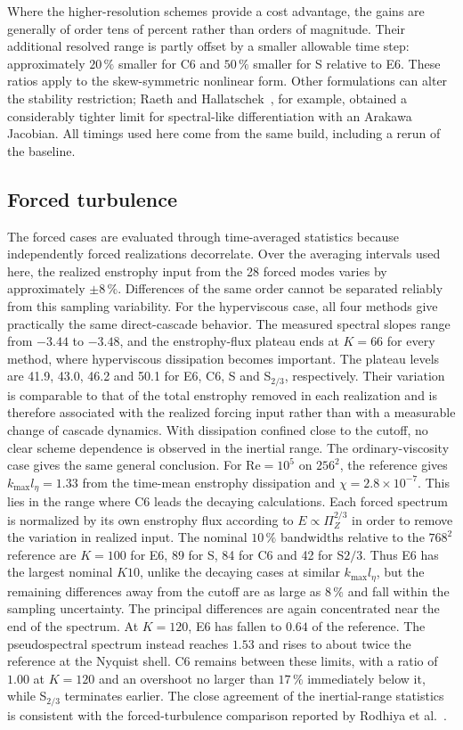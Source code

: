 \documentclass[11pt,a4paper]{article}
\newcommand{\Rey}{\mathrm{Re}}
\begin{document}
Where the higher-resolution schemes provide a cost advantage, the gains are generally of order tens of percent rather than orders of magnitude. Their additional resolved range is partly offset by a smaller allowable time step: approximately $20\,\%$ smaller for C6 and $50\,\%$ smaller for S relative to E6. These ratios apply to the skew-symmetric nonlinear form. Other formulations can alter the stability restriction; Raeth and Hallatschek~\cite{raeth2024}, for example, obtained a considerably tighter limit for spectral-like differentiation with an Arakawa Jacobian. All timings used here come from the same build, including a rerun of the baseline.
\subsection{Forced turbulence}
\label{sec:forced}
The forced cases are evaluated through time-averaged statistics because independently forced realizations decorrelate. Over the averaging intervals used here, the realized enstrophy input from the 28 forced modes varies by approximately $\pm8\,\%$. Differences of the same order cannot be separated reliably from this sampling variability.
For the hyperviscous case, all four methods give practically the same direct-cascade behavior. The measured spectral slopes range from $-3.44$ to $-3.48$, and the enstrophy-flux plateau ends at $K=66$ for every method, where hyperviscous dissipation becomes important. The plateau levels are 41.9, 43.0, 46.2 and 50.1 for E6, C6, S and S$_{2/3}$, respectively. Their variation is comparable to that of the total enstrophy removed in each realization and is therefore associated with the realized forcing input rather than with a measurable change of cascade dynamics. With dissipation confined close to the cutoff, no clear scheme dependence is observed in the inertial range.
The ordinary-viscosity case gives the same general conclusion. For $\Rey=10^5$ on $256^2$, the reference gives $k_{\max}l_\eta=1.33$ from the time-mean enstrophy dissipation and $\chi=2.8\times10^{-7}$. This lies in the range where C6 leads the decaying calculations. Each forced spectrum is normalized by its own enstrophy flux according to $E\propto\Pi_Z^{2/3}$ in order to remove the variation in realized input. The nominal $10\,\%$ bandwidths relative to the $768^2$ reference are $K=100$ for E6, 89 for S, 84 for C6 and 42 for S${2/3}$. Thus E6 has the largest nominal $K{10}$, unlike the decaying cases at similar $k_{\max}l_\eta$, but the remaining differences away from the cutoff are as large as $8\,\%$ and fall within the sampling uncertainty.
The principal differences are again concentrated near the end of the spectrum. At $K=120$, E6 has fallen to $0.64$ of the reference. The pseudospectral spectrum instead reaches $1.53$ and rises to about twice the reference at the Nyquist shell. C6 remains between these limits, with a ratio of $1.00$ at $K=120$ and an overshoot no larger than $17\,\%$ immediately below it, while S$_{2/3}$ terminates earlier. The close agreement of the inertial-range statistics is consistent with the forced-turbulence comparison reported by Rodhiya et al.~\cite{rodhiya2026}.
\end{document}
